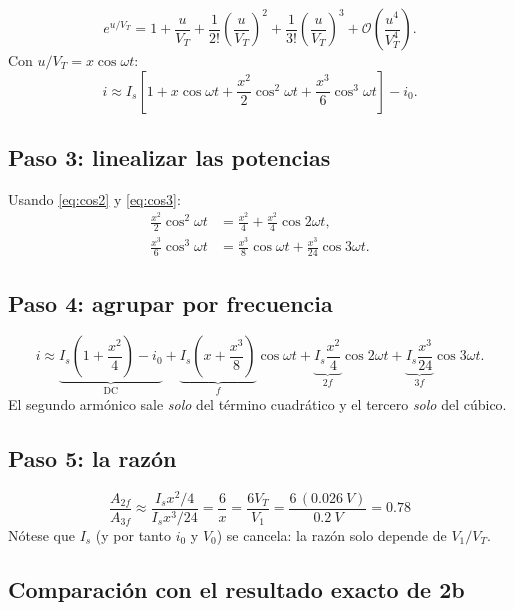 \documentclass[11pt,letterpaper]{article}
\newcommand{\VT}{V_T}
\begin{document}
\begin{equation}
  e^{u/\VT}=1+\frac{u}{\VT}+\frac{1}{2!}\left(\frac{u}{\VT}\right)^2+\frac{1}{3!}\left(\frac{u}{\VT}\right)^3+\mathcal{O}\!\left(\frac{u^4}{\VT^4}\right).
\end{equation}
Con $u/\VT=x\cos\omega t$:
\begin{equation}
  i\approx I_s\left[1+x\cos\omega t+\frac{x^2}{2}\cos^2\omega t+\frac{x^3}{6}\cos^3\omega t\right]-i_0 .
\end{equation}

\subsection{Paso 3: linealizar las potencias}

Usando \eqref{eq:cos2} y \eqref{eq:cos3}:
\begin{align}
  \frac{x^2}{2}\cos^2\omega t &= \frac{x^2}{4}+\frac{x^2}{4}\cos2\omega t,\\
  \frac{x^3}{6}\cos^3\omega t &= \frac{x^3}{8}\cos\omega t+\frac{x^3}{24}\cos3\omega t .
\end{align}

\subsection{Paso 4: agrupar por frecuencia}

\begin{equation}
  i\approx\underbrace{I_s\left(1+\frac{x^2}{4}\right)-i_0}_{\text{DC}}
  +\underbrace{I_s\left(x+\frac{x^3}{8}\right)}_{f}\cos\omega t
  +\underbrace{I_s\frac{x^2}{4}}_{2f}\cos2\omega t
  +\underbrace{I_s\frac{x^3}{24}}_{3f}\cos3\omega t .
\end{equation}
El segundo armónico sale \emph{solo} del término cuadrático y el tercero \emph{solo} del cúbico.

\subsection{Paso 5: la razón}

\begin{equation}
  \boxed{\;\frac{A_{2f}}{A_{3f}}\approx\frac{I_sx^2/4}{I_sx^3/24}=\frac{6}{x}=\frac{6\VT}{V_1}
  =\frac{6\,(\SI{0.026}{V})}{\SI{0.2}{V}}=0.78\;}
\end{equation}
Nótese que $I_s$ (y por tanto $i_0$ y $V_0$) se cancela: la razón solo depende de $V_1/\VT$.

\subsection{Comparación con el resultado exacto de 2b}
\end{document}
